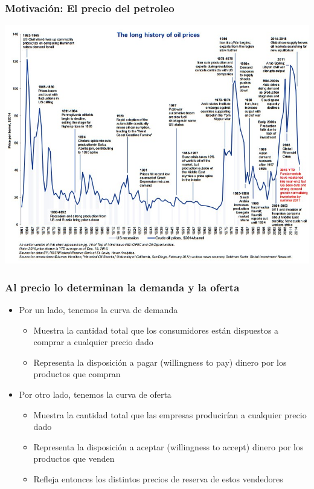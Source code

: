 \documentclass{beamer}
\begin{document}
\begin{frame}
\frametitle{Motivación: El precio del petroleo}
\centering
\includegraphics[scale=0.35]{Slides Principios de Economia/Figures/Tema_04.01_new.jpg}
\end{frame} 

\begin{frame}
\frametitle{Al precio lo determinan la demanda y la oferta}
\begin{itemize}
    \item Por un lado, tenemos la curva de demanda
    \begin{itemize}
        \item Muestra la cantidad total que los consumidores están dispuestos a comprar a cualquier precio dado
        \item Representa la disposición a pagar (willingness to pay) dinero por los productos que compran
    \end{itemize}
    \vspace{2mm}
    \item Por otro lado, tenemos la curva de oferta
    \begin{itemize}
        \item Muestra la cantidad total que las empresas producirían a cualquier precio dado
        \item Representa la disposición a aceptar (willingness to accept) dinero por los productos que venden
        \item Refleja entonces los distintos precios de reserva de estos vendedores
        \end{itemize}
\end{itemize}
\end{frame}
\end{document}
